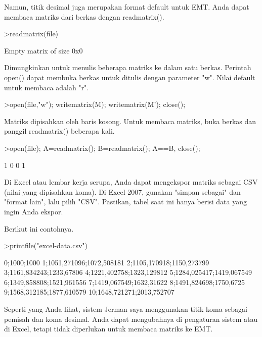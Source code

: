 \documentclass[a4paper,10pt]{article}
\begin{document}
\begin{eulernotebook}
\begin{eulercomment}
Namun, titik desimal juga merupakan format default untuk EMT. Anda
dapat membaca matriks dari berkas dengan readmatrix().
\end{eulercomment}
\begin{eulerprompt}
>readmatrix(file)
\end{eulerprompt}
\begin{euleroutput}
  Empty matrix of size 0x0
\end{euleroutput}
\begin{eulercomment}
Dimungkinkan untuk menulis beberapa matriks ke dalam satu berkas.
Perintah open() dapat membuka berkas untuk ditulis dengan parameter
"w". Nilai default untuk membaca adalah "r".
\end{eulercomment}
\begin{eulerprompt}
>open(file,"w"); writematrix(M); writematrix(M'); close();
\end{eulerprompt}
\begin{eulercomment}
Matriks dipisahkan oleh baris kosong. Untuk membaca matriks, buka
berkas dan panggil readmatrix() beberapa kali.
\end{eulercomment}
\begin{eulerprompt}
>open(file); A=readmatrix(); B=readmatrix(); A==B, close();
\end{eulerprompt}
\begin{euleroutput}
          1         0 
          0         1 
\end{euleroutput}
\begin{eulercomment}
Di Excel atau lembar kerja serupa, Anda dapat mengekspor matriks
sebagai CSV (nilai yang dipisahkan koma). Di Excel 2007, gunakan
"simpan sebagai" dan "format lain", lalu pilih "CSV". Pastikan, tabel
saat ini hanya berisi data yang ingin Anda ekspor.

Berikut ini contohnya.
\end{eulercomment}
\begin{eulerprompt}
>printfile("excel-data.csv")
\end{eulerprompt}
\begin{euleroutput}
  0;1000;1000
  1;1051,271096;1072,508181
  2;1105,170918;1150,273799
  3;1161,834243;1233,67806
  4;1221,402758;1323,129812
  5;1284,025417;1419,067549
  6;1349,858808;1521,961556
  7;1419,067549;1632,31622
  8;1491,824698;1750,6725
  9;1568,312185;1877,610579
  10;1648,721271;2013,752707
\end{euleroutput}
\begin{eulercomment}
Seperti yang Anda lihat, sistem Jerman saya menggunakan titik koma
sebagai pemisah dan koma desimal. Anda dapat mengubahnya di pengaturan
sistem atau di Excel, tetapi tidak diperlukan untuk membaca matriks ke
EMT.


\end{eulercomment}
\end{eulernotebook}
\end{document}
